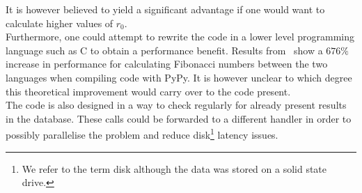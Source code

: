 It is however believed to yield a significant advantage if one would want to calculate higher values of $r_0$.\\
Furthermore, one could attempt to rewrite the code in a lower level programming language such as C to obtain a performance benefit.
Results from~\cite{jensenDrujensenFib2021} show a $676\%$ increase in performance for calculating Fibonacci numbers between the two languages when compiling code with PyPy.
It is however unclear to which degree this theoretical improvement would carry over to the code present.\\
The code is also designed in a way to check regularly for already present results in the database.
These calls could be forwarded to a different handler in order to possibly parallelise the problem and reduce disk\footnote{We refer to the term disk although the data was stored on a solid state drive.} latency issues.
%
%
%
